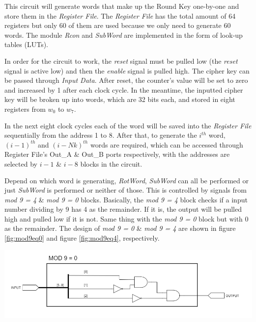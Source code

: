 \documentclass[a4paper, 10pt]{article}
\newenvironment{Figure}
    {\par\medskip\noindent\minipage{\linewidth}}
    {\endminipage\par\medskip}
\begin{document}
\begin{multicols}{2}
            This circuit will generate words that make up the Round Key one-by-one and store them in the \textit{Register File}. The \textit{Register File} has the total amount of 64 registers but only 60 of them are used because we only need to generate 60 words. The module \textit{Rcon} and \textit{SubWord} are implemented in the form of look-up tables (LUTs).

            In order for the circuit to work, the \textit{reset} signal must be pulled low (the \textit{reset} signal is active low) and then the \textit{enable} signal is pulled high. The cipher key can be passed through \textit{Input Data}. After reset, the counter's value will be set to zero and increased by 1 after each clock cycle. In the meantime, the inputted cipher key will be broken up into words, which are 32 bits each, and stored in eight registers from $w_{0}$ to $w_{7}$.
            
            In the next eight clock cycles each of the word will be saved into the \textit{Register File} sequentially from the address 1 to 8. After that, to generate the $i^{th}$ word, $(i-1)^{th}$ and $(i-Nk)^{th}$ words are required, which can be accessed through Register File's Out\_A \& Out\_B ports respectively, with the addresses are selected by $i-1$ \& $i-8$ blocks in the circuit.

            Depend on which word is generating, \textit{RotWord}, \textit{SubWord} can all be performed or just \textit{SubWord} is performed or neither of those. This is controlled by signals from \textit{mod 9 = 4} \& \textit{mod 9 = 0} blocks. Basically, the \textit{mod 9 = 4} block checks if a input number dividing by 9 has 4 as the remainder. If it is, the output will be pulled high and pulled low if it is not. Same thing with the \textit{mod 9 = 0} block but with 0 as the remainder. The design of \textit{mod 9 = 0} \& \textit{mod 9 = 4} are shown in figure \ref{fig:mod9eq0} and figure \ref{fig:mod9eq4}, respectively.
            
            \noindent
            \begin{Figure}
                \centering
                \includegraphics[width=\linewidth]{Mod9Eq0.png}
                \label{fig:mod9eq0}
            \end{Figure}


\end{multicols}
\end{document}
